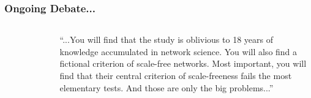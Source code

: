 \documentclass{beamer}
\begin{document}
		
		\begin{frame}\frametitle{Ongoing Debate...}
		  	
		  	\begin{columns}
				\begin{column}{.35\textwidth}
				\begin{figure}
					\centering
						\includegraphics[width=.9\textwidth]{barabasicropped}
					\caption{} \label{fig:}
				\end{figure}
					
				\end{column}
				\begin{column}{.65\textwidth}
				  	``...You will find that the study is oblivious to 18 years of knowledge accumulated in network science. You will also find a fictional criterion of scale-free networks. Most important, you will find that their central criterion of scale-freeness fails the most elementary tests. And those are only the big problems...''
			  	\end{column}
		  	\end{columns}

		\end{frame}
	
\end{document}
